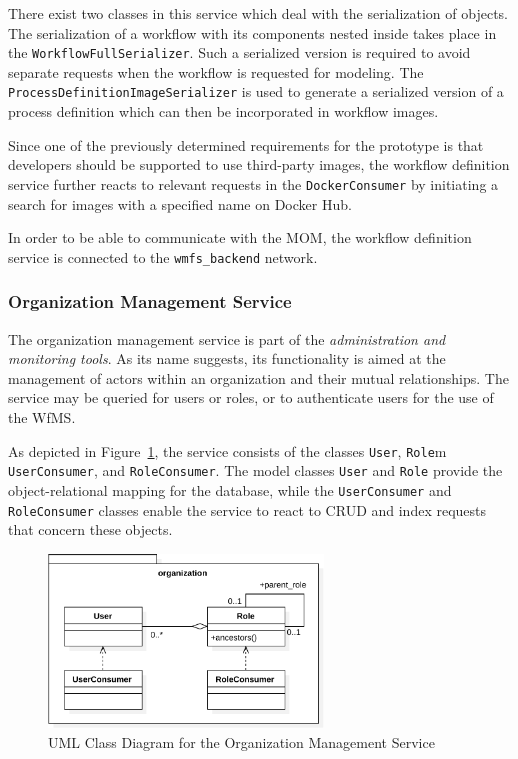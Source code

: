     There exist two classes in this service which deal with the serialization of objects.
    The serialization of a workflow with its components nested inside takes place in the \texttt{WorkflowFullSerializer}. Such a serialized version is required to avoid separate requests when the workflow is requested for modeling. The \texttt{ProcessDefinitionImageSerializer} is used to generate a serialized version of a process definition which can then be incorporated in workflow images.

    Since one of the previously determined requirements for the prototype is that developers should be supported to use third-party images, the workflow definition service further reacts to relevant requests in the \texttt{DockerConsumer} by initiating a search for images with a specified name on Docker Hub.

    In order to be able to communicate with the \ac{MOM}, the workflow definition service is connected to the \texttt{wmfs\_backend} network.

  \subsubsection{Organization Management Service} %
    \label{subs:organization_management_service}
    The organization management service is part of the \emph{administration and monitoring tools}.
    As its name suggests, its functionality is aimed at the management of actors within an organization and their mutual relationships. The service may be queried for users or roles, or to authenticate users for the use of the \ac{WfMS}.

    As depicted in Figure~\ref{fig:uml_class_diagram_for_the_organization_service}, the service consists of the classes \texttt{User}, \texttt{Role}m \texttt{UserConsumer}, and \texttt{RoleConsumer}.
    The model classes \texttt{User} and \texttt{Role} provide the object-relational mapping for the database, while the \texttt{UserConsumer} and \texttt{RoleConsumer} classes enable the service to react to \ac{CRUD} and index requests that concern these objects.

    \begin{figure}[htbp]
      \centering
      \includegraphics[width=0.65\textwidth]{content/images/class_diagram_organization-crop.pdf}
      \caption{UML Class Diagram for the Organization Management Service}
      \label{fig:uml_class_diagram_for_the_organization_service}
    \end{figure}

